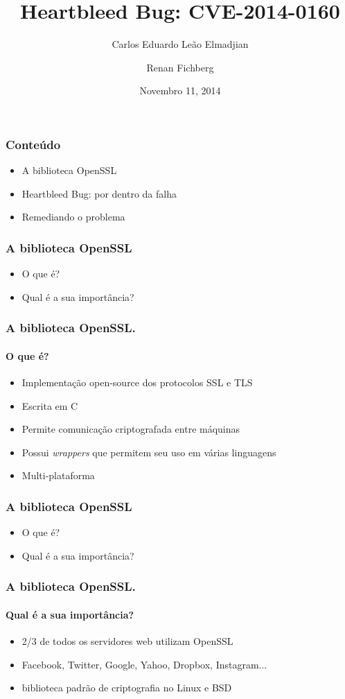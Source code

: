 \documentclass{beamer}
\title[Heartbleed Bug: CVE-2014-0160]{Heartbleed Bug: CVE-2014-0160}
\author{Carlos Eduardo Leão Elmadjian \and Renan Fichberg}
\date{Novembro 11, 2014}
\institute{Instituto de Matemática e Estatística da Universidade de São Paulo (IME-USP)}
\begin{document}
\begin{frame}
	\titlepage
\end{frame}

\begin{frame}
	\frametitle{Conteúdo}
	\begin{itemize}
		\item A biblioteca OpenSSL
		\item Heartbleed Bug: por dentro da falha
		\item Remediando o problema
	\end{itemize}
\end{frame}

\begin{frame}
	\frametitle{A biblioteca OpenSSL}
	\begin{itemize}
		\item O que é?
		\item Qual é a sua importância?
	\end{itemize}
\end{frame}

\begin{frame}
	\frametitle{A biblioteca OpenSSL.}
	\framesubtitle{O que é?}
	\begin{itemize}
		\item Implementação open-source dos protocolos SSL e TLS
		\item Escrita em C
		\item Permite comunicação criptografada entre máquinas
		\item Possui \textit{wrappers} que permitem seu uso em várias linguagens
		\item Multi-plataforma 
	\end{itemize}
\end{frame}

\begin{frame}
	\frametitle{A biblioteca OpenSSL}
	\begin{itemize}
		\item \textcolor{covered}{O que é?}
		\item Qual é a sua importância?
	\end{itemize}
\end{frame}

\begin{frame}
	\frametitle{A biblioteca OpenSSL.}
	\framesubtitle{Qual é a sua importância?}
	\begin{itemize}
		\item 2/3 de todos os servidores web utilizam OpenSSL
		\item Facebook, Twitter, Google, Yahoo, Dropbox, Instagram...
		\item  biblioteca padrão de criptografia no Linux e BSD
	\end{itemize}
\end{frame}
\end{document}
